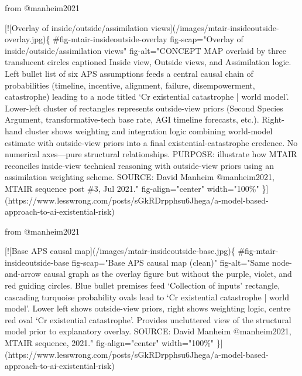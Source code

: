 \documentclass[
  11pt,
  letterpaper,
]{book}
\newenvironment{Shaded}{\begin{snugshade}}{\end{snugshade}}
\newcommand{\CommentTok}[1]{\textcolor[rgb]{0.37,0.37,0.37}{#1}}
\newcommand{\NormalTok}[1]{\textcolor[rgb]{0.00,0.23,0.31}{#1}}
\newcommand{\OtherTok}[1]{\textcolor[rgb]{0.00,0.23,0.31}{#1}}
\begin{document}
\begin{Shaded}
\begin{Highlighting}[]
\NormalTok{from @manheim2021}

\CommentTok{[}\OtherTok{![Overlay of inside/outside/assimilation views}\CommentTok{](/images/mtair{-}insideoutside{-}overlay.jpg)}\NormalTok{\{}
\NormalTok{    \#fig{-}mtair{-}insideoutside{-}overlay}
\NormalTok{    fig{-}scap="Overlay of inside/outside/assimilation views"}
\NormalTok{    fig{-}alt="CONCEPT MAP overlaid by three translucent circles captioned Inside view, Outside views, and Assimilation logic. Left bullet list of six APS assumptions feeds a central causal chain of probabilities (timeline, incentive, alignment, failure, disempowerment, catastrophe) leading to a node titled ‘Cr existential catastrophe | world model’. Lower{-}left cluster of rectangles represents outside{-}view priors (Second Species Argument, transformative{-}tech base rate, AGI timeline forecasts, etc.). Right{-}hand cluster shows weighting and integration logic combining world{-}model estimate with outside{-}view priors into a final existential{-}catastrophe credence. No numerical axes—pure structural relationships. PURPOSE: illustrate how MTAIR reconciles inside{-}view technical reasoning with outside{-}view priors using an assimilation weighting scheme. SOURCE: David Manheim @manheim2021, MTAIR sequence post \#3, Jul 2021."}
\NormalTok{    fig{-}align="center"}
\NormalTok{    width="100\%"}
\NormalTok{\}](https://www.lesswrong.com/posts/sGkRDrpphsu6Jhega/a{-}model{-}based{-}approach{-}to{-}ai{-}existential{-}risk)}




\NormalTok{from @manheim2021}

\CommentTok{[}\OtherTok{![Base APS causal map}\CommentTok{](/images/mtair{-}insideoutside{-}base.jpg)}\NormalTok{\{}
\NormalTok{    \#fig{-}mtair{-}insideoutside{-}base}
\NormalTok{    fig{-}scap="Base APS causal map (clean)"}
\NormalTok{    fig{-}alt="Same node{-}and{-}arrow causal graph as the overlay figure but without the purple, violet, and red guiding circles. Blue bullet premises feed ‘Collection of inputs’ rectangle, cascading turquoise probability ovals lead to ‘Cr existential catastrophe | world model’. Lower left shows outside{-}view priors, right shows weighting logic, centre red oval ‘Cr existential catastrophe’. Provides uncluttered view of the structural model prior to explanatory overlay. SOURCE: David Manheim @manheim2021, MTAIR sequence, 2021."}
\NormalTok{    fig{-}align="center"}
\NormalTok{    width="100\%"}
\NormalTok{\}](https://www.lesswrong.com/posts/sGkRDrpphsu6Jhega/a{-}model{-}based{-}approach{-}to{-}ai{-}existential{-}risk)}












\end{Highlighting}
\end{Shaded}
\end{document}

